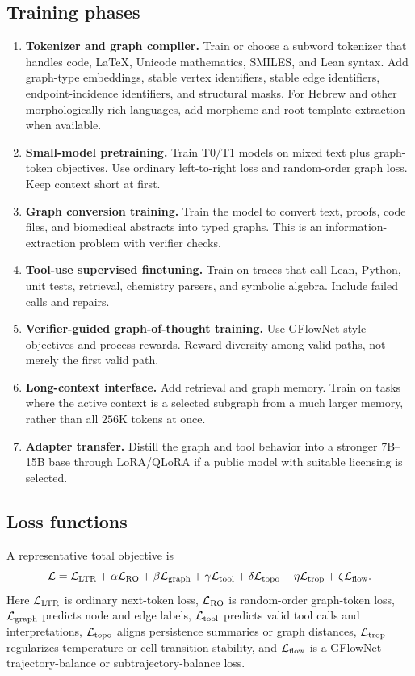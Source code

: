 \documentclass[11pt]{article}
\newcommand{\1}{\mathbf{1}}
\begin{document}
\subsection{Training phases}

\begin{enumerate}
\item \textbf{Tokenizer and graph compiler.} Train or choose a subword tokenizer that handles code, LaTeX, Unicode mathematics, SMILES, and Lean syntax. Add graph-type embeddings, stable vertex identifiers, stable edge identifiers, endpoint-incidence identifiers, and structural masks. For Hebrew and other morphologically rich languages, add morpheme and root-template extraction when available.
\item \textbf{Small-model pretraining.} Train T0/T1 models on mixed text plus graph-token objectives. Use ordinary left-to-right loss and random-order graph loss. Keep context short at first.
\item \textbf{Graph conversion training.} Train the model to convert text, proofs, code files, and biomedical abstracts into typed graphs. This is an information-extraction problem with verifier checks.
\item \textbf{Tool-use supervised finetuning.} Train on traces that call Lean, Python, unit tests, retrieval, chemistry parsers, and symbolic algebra. Include failed calls and repairs.
\item \textbf{Verifier-guided graph-of-thought training.} Use GFlowNet-style objectives and process rewards. Reward diversity among valid paths, not merely the first valid path.
\item \textbf{Long-context interface.} Add retrieval and graph memory. Train on tasks where the active context is a selected subgraph from a much larger memory, rather than all $256$K tokens at once.
\item \textbf{Adapter transfer.} Distill the graph and tool behavior into a stronger 7B--15B base through LoRA/QLoRA if a public model with suitable licensing is selected.
\end{enumerate}

\subsection{Loss functions}

A representative total objective is
\[
\mathcal{L}=\mathcal{L}_{\rm LTR}+\alpha\mathcal{L}_{\rm RO}+\beta\mathcal{L}_{\rm graph}+\gamma\mathcal{L}_{\rm tool}+\delta\mathcal{L}_{\rm topo}+\eta\mathcal{L}_{\rm trop}+\zeta\mathcal{L}_{\rm flow}.
\]
Here $\mathcal{L}_{\rm LTR}$ is ordinary next-token loss, $\mathcal{L}_{\rm RO}$ is random-order graph-token loss, $\mathcal{L}_{\rm graph}$ predicts node and edge labels, $\mathcal{L}_{\rm tool}$ predicts valid tool calls and interpretations, $\mathcal{L}_{\rm topo}$ aligns persistence summaries or graph distances, $\mathcal{L}_{\rm trop}$ regularizes temperature or cell-transition stability, and $\mathcal{L}_{\rm flow}$ is a GFlowNet trajectory-balance or subtrajectory-balance loss.
\end{document}
